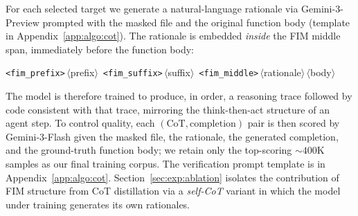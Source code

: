 For each selected target we generate a natural-language rationale via
Gemini-3-Preview prompted with the masked file and the original function
body (template in Appendix~\ref{app:algo:cot}). The rationale is
embedded \emph{inside} the FIM middle span, immediately before the
function body:
\vspace{-0.5ex}
\begin{center}\small
\texttt{<fim\_prefix>}\,$\langle$prefix$\rangle$\,%
\texttt{<fim\_suffix>}\,$\langle$suffix$\rangle$\,%
\texttt{<fim\_middle>}\,$\langle$rationale$\rangle$\,$\langle$body$\rangle$
\end{center}
The model is therefore trained to produce, in order, a reasoning trace
followed by code consistent with that trace, mirroring the
think-then-act structure of an agent step. To control quality, each
$(\text{CoT}, \text{completion})$ pair is then scored by Gemini-3-Flash
given the masked file, the rationale, the generated completion, and the
ground-truth function body; we retain only the top-scoring
$\sim\!400$K samples as our final training corpus. The verification
prompt template is in Appendix~\ref{app:algo:cot}.
Section~\ref{sec:exp:ablation}
isolates the contribution of FIM structure from CoT distillation via a
\emph{self-CoT} variant in which the model under training generates its
own rationales.
